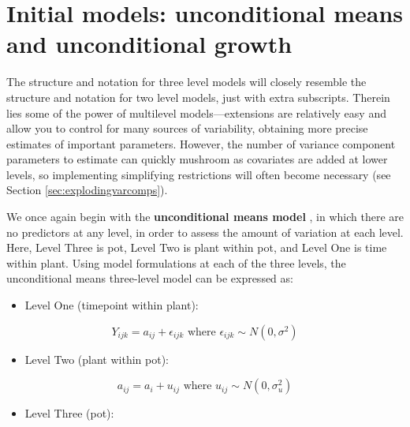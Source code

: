 \documentclass[
]{krantz}
\providecommand{\tightlist}{%
  \setlength{\itemsep}{0pt}\setlength{\parskip}{0pt}}
\begin{document}
\hypertarget{initialmodels-3level}{%
\section{Initial models: unconditional means and unconditional growth}\label{initialmodels-3level}}

The structure and notation for three level models will closely resemble the structure and notation for two level models, just with extra subscripts. Therein lies some of the power of multilevel models---extensions are relatively easy and allow you to control for many sources of variability, obtaining more precise estimates of important parameters. However, the number of variance component parameters to estimate can quickly mushroom as covariates are added at lower levels, so implementing simplifying restrictions will often become necessary (see Section \ref{sec:explodingvarcomps}).

We once again begin with the \textbf{unconditional means model} , in which there are no predictors at any level, in order to assess the amount of variation at each level. Here, Level Three is pot, Level Two is plant within pot, and Level One is time within plant. Using model formulations at each of the three levels, the unconditional means three-level model can be expressed as:

\begin{itemize}
\tightlist
\item
  Level One (timepoint within plant):
\end{itemize}

\begin{equation*}
Y_{ijk} = a_{ij}+\epsilon_{ijk} \textrm{ where } \epsilon_{ijk}\sim N(0,\sigma^2)
\end{equation*}

\begin{itemize}
\tightlist
\item
  Level Two (plant within pot):
\end{itemize}

\begin{equation*}
a_{ij} = a_{i}+u_{ij} \textrm{ where } u_{ij}\sim N(0,\sigma_{u}^{2})
\end{equation*}

\begin{itemize}
\tightlist
\item
  Level Three (pot):
\end{itemize}
\end{document}
